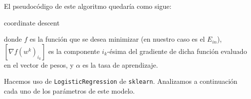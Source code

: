 \documentclass[a4]{article}
\begin{document}
\begin{itemize}
	El pseudocódigo de este algoritmo quedaría como sigue: 
		
	\begin{algorithm}
	\DontPrintSemicolon
	\caption{\sc coordinate descent}
	\end{algorithm}	

donde $f$ es la función que se desea minimizar (en nuestro caso es el $E_{in}$), $ \left[\nabla f(w^k)_{i_k}\right] $ es la componente $i_k$-ésima del gradiente de dicha función evaluado en el vector de pesos, y $\alpha$ es la tasa de aprendizaje. 
\end{itemize}
Hacemos uso de \lstinline|LogisticRegression| de \lstinline|sklearn|. Analizamos a continuación cada uno de los parámetros de este modelo.
\end{document}
